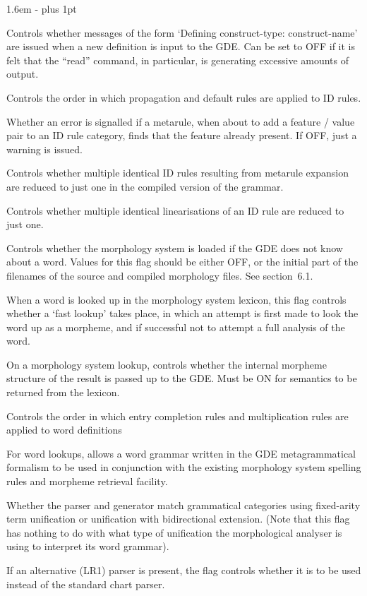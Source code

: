 \begin{list}{}
   {\leftmargin 1.6em
    \itemindent -\leftmargin
    \parsep 0pt plus 1pt}

 {Controls whether messages of the form `Defining
\la construct-type\ran: \la construct-name\ran' are issued when a new
definition is input to the GDE. Can be set to OFF if it is felt that
the ``read'' command, in particular, is generating excessive amounts
of output.}

 {Controls the order in which propagation and
default rules are applied to ID rules.}

 {Whether an error is signalled if a metarule, when
about to add a feature / value pair to an ID rule category, finds that the feature
already present. If OFF, just a warning is issued.}

 {Controls whether multiple identical ID rules
resulting from metarule expansion are reduced to just one in the compiled
version of the grammar.}

 {Controls whether multiple identical
linearisations of an ID rule are reduced to just one.}

 {Controls whether the morphology system is loaded if
the GDE does not know about a word. Values for this flag should be either
OFF, or the initial part of the filenames of the source and compiled
morphology files. See section~6.1.}

 {When a word is looked up in the morphology system
lexicon, this flag controls whether a `fast lookup' takes place, in
which an attempt is first made to look the word up as a morpheme, and if
successful not to attempt a full analysis of the word.}

 {On a morphology system lookup, controls
whether the internal morpheme structure of the result is passed up to the GDE.
Must be ON for semantics to be returned from the lexicon.}

 {Controls the order in which entry completion rules
and multiplication rules are applied to word definitions}

 {For word lookups, allows a word grammar written
in the GDE metagrammatical formalism to be used in conjunction with the
existing morphology system spelling rules and morpheme retrieval facility.}

 {Whether the parser and generator match grammatical
categories using fixed-arity term unification or unification with
bidirectional extension. (Note that this flag has nothing to do with what type of
unification the morphological analyser is using to interpret its word grammar).}

 {If an alternative (LR1) parser is present, the flag
controls whether it is to be used instead of the standard chart parser.}
\end{list}

